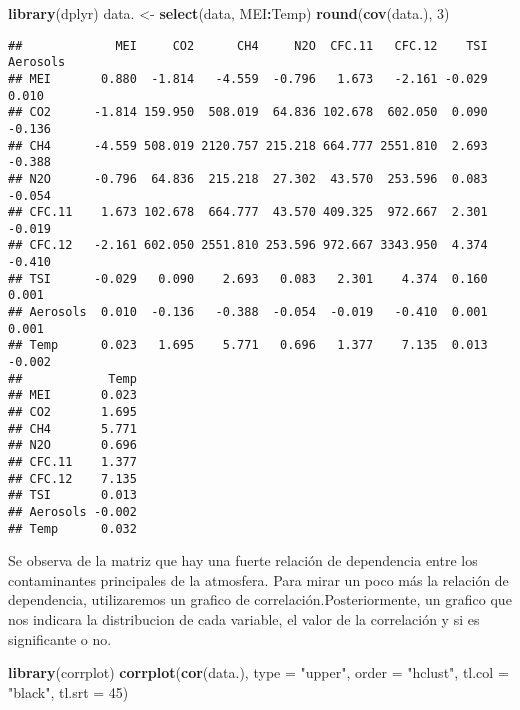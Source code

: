 \documentclass[]{article}
\newenvironment{Shaded}{\begin{snugshade}}{\end{snugshade}}
\newcommand{\KeywordTok}[1]{\textcolor[rgb]{0.13,0.29,0.53}{\textbf{#1}}}
\newcommand{\DataTypeTok}[1]{\textcolor[rgb]{0.13,0.29,0.53}{#1}}
\newcommand{\DecValTok}[1]{\textcolor[rgb]{0.00,0.00,0.81}{#1}}
\newcommand{\StringTok}[1]{\textcolor[rgb]{0.31,0.60,0.02}{#1}}
\newcommand{\OperatorTok}[1]{\textcolor[rgb]{0.81,0.36,0.00}{\textbf{#1}}}
\newcommand{\NormalTok}[1]{#1}
\begin{document}
\begin{Shaded}
\begin{Highlighting}[]
\KeywordTok{library}\NormalTok{(dplyr)}
\NormalTok{data. <-}\StringTok{ }\KeywordTok{select}\NormalTok{(data, MEI}\OperatorTok{:}\NormalTok{Temp)}
\KeywordTok{round}\NormalTok{(}\KeywordTok{cov}\NormalTok{(data.), }\DecValTok{3}\NormalTok{)}
\end{Highlighting}
\end{Shaded}

\begin{verbatim}
##             MEI     CO2      CH4     N2O  CFC.11   CFC.12    TSI Aerosols
## MEI       0.880  -1.814   -4.559  -0.796   1.673   -2.161 -0.029    0.010
## CO2      -1.814 159.950  508.019  64.836 102.678  602.050  0.090   -0.136
## CH4      -4.559 508.019 2120.757 215.218 664.777 2551.810  2.693   -0.388
## N2O      -0.796  64.836  215.218  27.302  43.570  253.596  0.083   -0.054
## CFC.11    1.673 102.678  664.777  43.570 409.325  972.667  2.301   -0.019
## CFC.12   -2.161 602.050 2551.810 253.596 972.667 3343.950  4.374   -0.410
## TSI      -0.029   0.090    2.693   0.083   2.301    4.374  0.160    0.001
## Aerosols  0.010  -0.136   -0.388  -0.054  -0.019   -0.410  0.001    0.001
## Temp      0.023   1.695    5.771   0.696   1.377    7.135  0.013   -0.002
##            Temp
## MEI       0.023
## CO2       1.695
## CH4       5.771
## N2O       0.696
## CFC.11    1.377
## CFC.12    7.135
## TSI       0.013
## Aerosols -0.002
## Temp      0.032
\end{verbatim}

Se observa de la matriz que hay una fuerte relación de dependencia entre
los contaminantes principales de la atmosfera. Para mirar un poco más la
relación de dependencia, utilizaremos un grafico de
correlación.Posteriormente, un grafico que nos indicara la distribucion
de cada variable, el valor de la correlación y si es significante o no.

\begin{Shaded}
\begin{Highlighting}[]
\KeywordTok{library}\NormalTok{(corrplot)}
\KeywordTok{corrplot}\NormalTok{(}\KeywordTok{cor}\NormalTok{(data.), }\DataTypeTok{type =} \StringTok{"upper"}\NormalTok{, }\DataTypeTok{order =} \StringTok{"hclust"}\NormalTok{, }
         \DataTypeTok{tl.col =} \StringTok{"black"}\NormalTok{, }\DataTypeTok{tl.srt =} \DecValTok{45}\NormalTok{)}
\end{Highlighting}
\end{Shaded}
\end{document}
